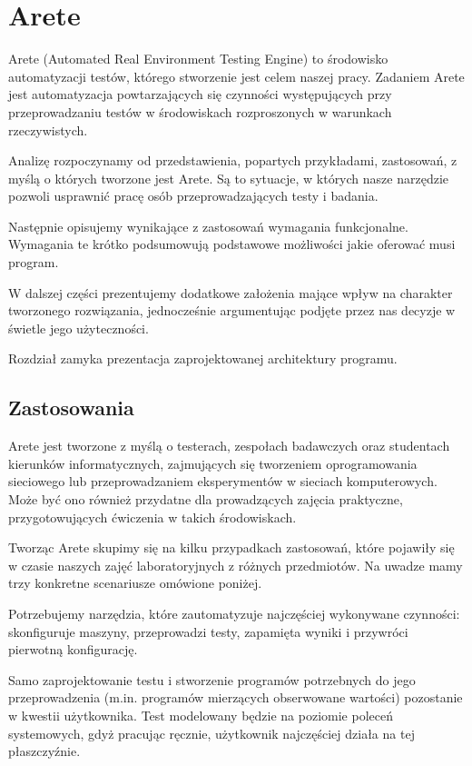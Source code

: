 \documentclass[00-praca-magisterska.tex]{subfiles}
\begin{document}
\chapter{Arete}
\label{arete}

Arete (Automated Real Environment Testing Engine) to środowisko automatyzacji
testów, którego stworzenie jest celem naszej pracy. Zadaniem Arete jest
automatyzacja powtarzających się czynności występujących przy przeprowadzaniu
testów w środowiskach rozproszonych w warunkach rzeczywistych.

Analizę rozpoczynamy od przedstawienia, popartych przykładami, zastosowań, z
myślą o których tworzone jest Arete. Są to sytuacje, w których nasze narzędzie
pozwoli usprawnić pracę osób przeprowadzających testy i badania.

Następnie opisujemy wynikające z zastosowań wymagania funkcjonalne. Wymagania
te krótko podsumowują podstawowe możliwości jakie oferować musi program.

W dalszej części prezentujemy dodatkowe założenia mające wpływ na charakter
tworzonego rozwiązania, jednocześnie argumentując podjęte przez nas decyzje w
świetle jego użyteczności.

Rozdział zamyka prezentacja zaprojektowanej architektury programu.

\section{Zastosowania}
\label{arete-zastosowania}

Arete jest tworzone z myślą o testerach, zespołach badawczych oraz studentach
kierunków informatycznych, zajmujących się tworzeniem oprogramowania sieciowego
lub przeprowadzaniem eksperymentów w sieciach komputerowych. Może być ono
również przydatne dla prowadzących zajęcia praktyczne, przygotowujących
ćwiczenia w takich środowiskach.

Tworząc Arete skupimy się na kilku przypadkach zastosowań, które pojawiły się w
czasie naszych zajęć laboratoryjnych z różnych przedmiotów. Na uwadze mamy
trzy konkretne scenariusze omówione poniżej.

Potrzebujemy narzędzia, które zautomatyzuje najczęściej wykonywane
czynności: skonfiguruje maszyny, przeprowadzi testy, zapamięta wyniki i
przywróci pierwotną konfigurację.

Samo zaprojektowanie testu i stworzenie programów potrzebnych do jego
przeprowadzenia (m.in. programów mierzących obserwowane wartości) pozostanie w
kwestii użytkownika. Test modelowany będzie na poziomie poleceń systemowych,
gdyż pracując ręcznie, użytkownik najczęściej działa na tej płaszczyźnie.
\end{document}
